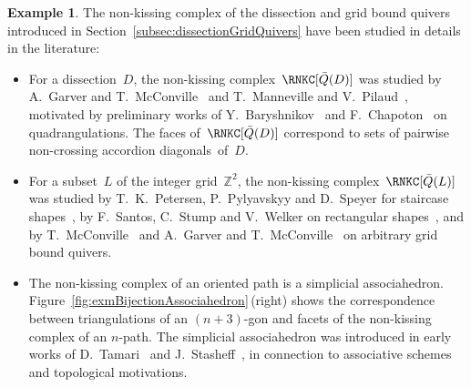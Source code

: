 \documentclass{amsart}
\theoremstyle{definition}
\newtheorem{example}[theorem]{Example}
\newcommand{\Z}{\mathbb{Z}} %
\newcommand{\fref}[1]{Figure~\ref{#1}} %
\begin{document}
\begin{example}
The non-kissing complex of the dissection and grid bound quivers introduced in Section~\ref{subsec:dissectionGridQuivers} have been studied in details in the literature:
\begin{itemize}
\item For a dissection~$D$, the non-kissing complex~$\RNKC[\bar Q(D)]$ was studied by A.~Garver and T.~McConville~\cite{GarverMcConville} and T.~Manneville and V.~Pilaud~\cite{MannevillePilaud-accordion}, motivated by preliminary works of Y.~Baryshnikov~\cite{Baryshnikov} and F.~Chapoton~\cite{Chapoton-quadrangulations} on quadrangulations. The faces of~$\RNKC[\bar Q(D)]$ correspond to sets of pairwise non-crossing accordion diagonals~of~$D$.
\item For a subset~$L$ of the integer grid~$\Z^2$, the non-kissing complex~$\RNKC[\bar Q(L)]$ was studied by T.~K.~Petersen, P.~Pylyavskyy and D.~Speyer for staircase shapes~\cite{PetersenPylyavskyySpeyer}, by F.~Santos, C.~Stump and V.~Welker on rectangular shapes~\cite{SantosStumpWelker}, and by T.~McConville~\cite{McConville} and A.~Garver and T.~McConville~\cite{GarverMcConville-grid} on arbitrary grid bound quivers. %
\item The non-kissing complex of an oriented path is a simplicial associahedron. \fref{fig:exmBijectionAssociahedron}\,(right) shows the correspondence between triangulations of an $(n+3)$-gon and facets of the non-kissing complex of an $n$-path. The simplicial associahedron was introduced in early works of D.~Tamari~\cite{Tamari} and J.~Stasheff~\cite{Stasheff}, in connection to associative schemes and topological motivations.
\end{itemize}
\end{example}
\end{document}
